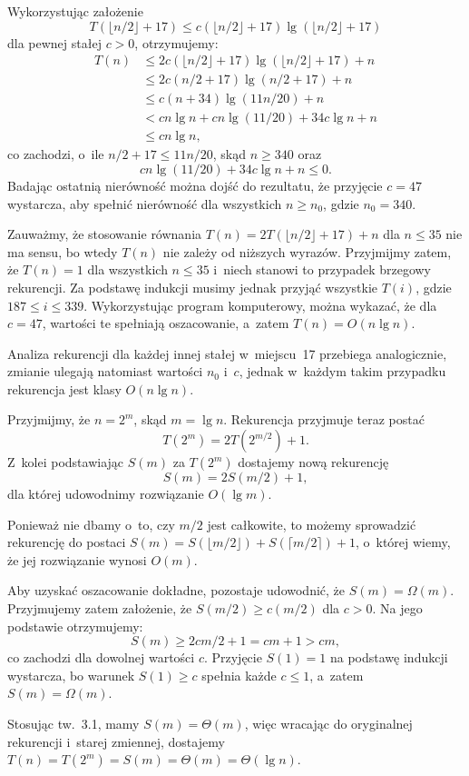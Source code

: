 \exercise %
Wykorzystując założenie
\[
	T(\lfloor n/2\rfloor+17) \le c(\lfloor n/2\rfloor+17)\lg(\lfloor n/2\rfloor+17)
\]
dla pewnej stałej $c>0$, otrzymujemy:
\begin{align*}
	T(n) &\le 2c(\lfloor n/2\rfloor+17)\lg(\lfloor n/2\rfloor+17)+n \\
	&\le 2c(n/2+17)\lg(n/2+17)+n \\
	&\le c(n+34)\lg(11n/20)+n \\
	&< cn\lg n+cn\lg(11/20)+34c\lg n+n \\
	&\le cn\lg n,
\end{align*}
co zachodzi, o~ile $n/2+17\le 11n/20$, skąd $n\ge340$ oraz
\[
	cn\lg(11/20)+34c\lg n+n \le 0.
\]
Badając ostatnią nierówność można dojść do rezultatu, że przyjęcie $c=47$ wystarcza, aby spełnić nierówność dla wszystkich $n\ge n_0$, gdzie $n_0=340$.

Zauważmy, że stosowanie równania $T(n)=2T(\lfloor n/2\rfloor+17)+n$ dla $n\le35$ nie ma sensu, bo wtedy $T(n)$ nie zależy od niższych wyrazów. Przyjmijmy zatem, że $T(n)=1$ dla wszystkich $n\le35$ i~niech stanowi to przypadek brzegowy rekurencji. Za podstawę indukcji musimy jednak przyjąć wszystkie $T(i)$, gdzie $187\le i\le339$. Wykorzystując program komputerowy, można wykazać, że dla $c=47$, wartości te spełniają oszacowanie, a~zatem $T(n)=O(n\lg n)$.

Analiza rekurencji dla każdej innej stałej w~miejscu~17 przebiega analogicznie, zmianie ulegają natomiast wartości $n_0$ i~$c$, jednak w~każdym takim przypadku rekurencja jest klasy $O(n\lg n)$.

\exercise %
Przyjmijmy, że $n=2^m$, skąd $m=\lg n$. Rekurencja przyjmuje teraz postać
\[
	T(2^m) = 2T(2^{m/2})+1.
\]
Z~kolei podstawiając $S(m)$ za $T(2^m)$ dostajemy nową rekurencję
\[
	S(m) = 2S(m/2)+1,
\]
dla której udowodnimy rozwiązanie $O(\lg m)$.

Ponieważ nie dbamy o~to, czy $m/2$ jest całkowite, to możemy sprowadzić rekurencję do postaci $S(m)=S(\lfloor m/2\rfloor)+S(\lceil m/2\rceil)+1$, o~której wiemy, że jej rozwiązanie wynosi $O(m)$.

Aby uzyskać oszacowanie dokładne, pozostaje udowodnić, że $S(m)=\Omega(m)$. Przyjmujemy zatem założenie, że $S(m/2)\ge c(m/2)$ dla $c>0$. Na jego podstawie otrzymujemy:
\[
	S(m) \ge 2cm/2+1 = cm+1 > cm,
\]
co zachodzi dla dowolnej wartości $c$. Przyjęcie $S(1)=1$ na podstawę indukcji wystarcza, bo warunek $S(1)\ge c$ spełnia każde $c\le1$, a~zatem $S(m)=\Omega(m)$.

Stosując tw.~3.1, mamy $S(m)=\Theta(m)$, więc wracając do oryginalnej rekurencji i~starej zmiennej, dostajemy $T(n)=T(2^m)=S(m)=\Theta(m)=\Theta(\lg n)$.

